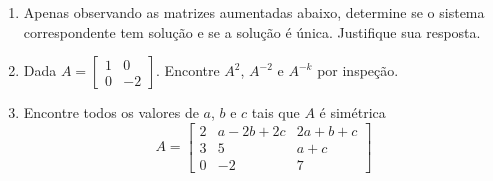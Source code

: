 \documentclass[a4paper,5pt]{amsbook}
\begin{document}
\begin{enumerate}
	\vspace{0.5cm}
	\item Apenas observando as matrizes aumentadas abaixo, determine se o
		sistema correspondente tem solu\c{c}\~ao e se a solu\c{c}\~ao \'e \'unica. Justifique
		sua resposta.


	\vspace{0.5cm}
	\item Dada $A =
		\begin{bmatrix}
			1 & 0 \\
			0 & -2
		\end{bmatrix}$.
		Encontre $A^2$, $A^{-2}$ e $A^{-k}$ por inspe\c{c}\~ao.

	\vspace{0.5cm}
	\item Encontre todos os valores de $a$, $b$ e $c$ tais que $A$ \'e sim\'etrica
		\[A = \begin{bmatrix}
				2 & a-2b+2c & 2a+b+c \\
				3 & 5 & a+c \\
				0 & -2 & 7
			\end{bmatrix}\]


\end{enumerate}
\end{document}

